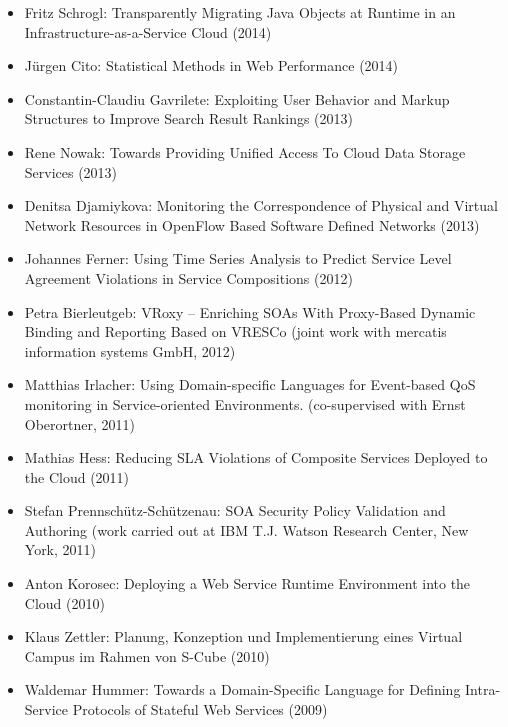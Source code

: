 \documentclass[paper=letter,fontsize=11pt]{scrartcl} %
\begin{document}
\begin{itemize}
  \item Fritz Schrogl: Transparently Migrating Java Objects at Runtime in an Infrastructure-as-a-Service Cloud (2014)
  \item J\"urgen Cito: Statistical Methods in Web Performance (2014)
  \item Constantin-Claudiu Gavrilete: Exploiting User Behavior and Markup Structures to Improve Search Result Rankings (2013)
  \item Rene Nowak: Towards Providing Unified Access To Cloud Data Storage Services (2013)
  \item Denitsa Djamiykova: Monitoring the Correspondence of Physical and Virtual Network Resources in OpenFlow Based Software Defined Networks (2013)
  \item Johannes Ferner:  Using Time Series Analysis to Predict Service Level Agreement Violations in Service Compositions (2012)
\item Petra Bierleutgeb:  VRoxy -- Enriching SOAs With Proxy-Based Dynamic
  Binding and Reporting Based on VRESCo (joint work with mercatis information systems GmbH, 2012)
  \item Matthias Irlacher: Using Domain-specific Languages for Event-based QoS monitoring in Service-oriented Environments. (co-supervised with Ernst Oberortner, 2011)
  \item Mathias Hess:  Reducing SLA Violations of Composite Services Deployed to the Cloud (2011)
  \item Stefan Prennsch\"utz-Sch\"utzenau:  SOA Security Policy Validation and
  Authoring (work carried out at IBM T.J. Watson Research Center, New York, 2011)
    \item Anton Korosec:  Deploying a Web Service Runtime Environment into the
  Cloud (2010)
  \item Klaus Zettler:  Planung, Konzeption und Implementierung eines Virtual
  Campus im Rahmen von S-Cube (2010)
  \item Waldemar Hummer:  Towards a Domain-Specific Language for Defining
  Intra-Service Protocols of Stateful Web Services (2009)
\end{itemize}
\end{document}
